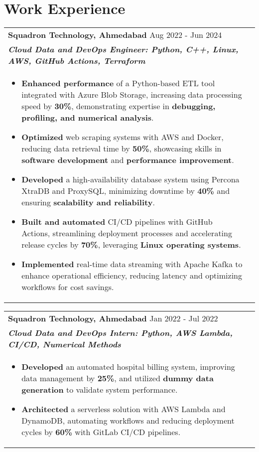 \documentclass[a4paper,10pt]{article}
\begin{document}
\section{Work Experience}

\begin{tabularx}{\linewidth}{ @{}l r@{} }
\textbf{Squadron Technology, Ahmedabad} \hfill \color[HTML]{371e77} Aug 2022 - Jun 2024 \\[1pt]
\color[HTML]{371e77}\textbf{\textit{Cloud Data and DevOps Engineer: Python, C++, Linux, AWS, GitHub Actions, Terraform}} \\[1pt]
\begin{minipage}[t]{\linewidth}
\begin{itemize}[nosep, after=\strut, leftmargin=2em, itemsep=2pt]
\item \textbf{Enhanced performance} of a Python-based ETL tool integrated with Azure Blob Storage, increasing data processing speed by \textbf{30\%}, demonstrating expertise in \textbf{debugging, profiling, and numerical analysis}.
\item \textbf{Optimized} web scraping systems with AWS and Docker, reducing data retrieval time by \textbf{50\%}, showcasing skills in \textbf{software development} and \textbf{performance improvement}.
\item \textbf{Developed} a high-availability database system using Percona XtraDB and ProxySQL, minimizing downtime by \textbf{40\%} and ensuring \textbf{scalability and reliability}.
\item \textbf{Built and automated} CI/CD pipelines with GitHub Actions, streamlining deployment processes and accelerating release cycles by \textbf{70\%}, leveraging \textbf{Linux operating systems}.
\item \textbf{Implemented} real-time data streaming with Apache Kafka to enhance operational efficiency, reducing latency and optimizing workflows for cost savings.
\end{itemize}
\end{minipage}
\end{tabularx}
\begin{tabularx}{\linewidth}{ @{}l r@{} }
\textbf{Squadron Technology, Ahmedabad} \hfill \color[HTML]{371e77} Jan 2022 - Jul 2022 \\[1pt]
\color[HTML]{371e77}\textbf{\textit{Cloud Data and DevOps Intern: Python, AWS Lambda, CI/CD, Numerical Methods}} \\[1pt]
\begin{minipage}[t]{\linewidth}
\begin{itemize}[nosep, after=\strut, leftmargin=2em, itemsep=2pt]
\item \textbf{Developed} an automated hospital billing system, improving data management by \textbf{25\%}, and utilized \textbf{dummy data generation} to validate system performance.
\item \textbf{Architected} a serverless solution with AWS Lambda and DynamoDB, automating workflows and reducing deployment cycles by \textbf{60\%} with GitLab CI/CD pipelines.
\end{itemize}
\end{minipage}
\end{tabularx}
\end{document}
